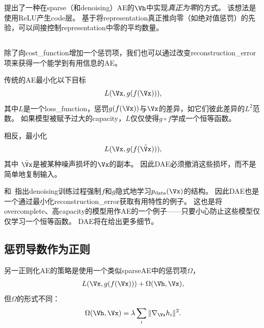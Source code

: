 \citet{Glorot+al-ICML-2011-small}提出了一种在\gls{sparse}（和\gls{denoising}）\gls{AE}的$\Vh$中实现\emph{真正为零}的方式。
该想法是使用\gls{ReLU}产生\gls{code}层。
基于将\gls{representation}真正推向零（如绝对值惩罚）的先验，可以间接控制\gls{representation}中零的平均数量。



\subsection{}
\label{sec:sub_denoising_autoencoders}
除了向\gls{cost_function}增加一个惩罚项，我们也可以通过改变\gls{reconstruction_error}项来获得一个能学到有用信息的\gls{AE}。


传统的\gls{AE}最小化以下目标
\begin{align}
    L(\Vx, g(f(\Vx))),
\end{align}
其中$L$是一个\gls{loss_function}，惩罚$g(f(\Vx))$与$\Vx$的差异，如它们彼此差异的$L^2$范数。
如果模型被赋予过大的\gls{capacity}，$L$仅仅使得$g \circ  f$学成一个恒等函数。


相反，最小化 
\begin{align}
    L(\Vx, g(f(\tilde \Vx))),
\end{align}
其中 $\tilde \Vx$是被某种噪声损坏的$\Vx$的副本。
因此\gls{DAE}必须撤消这些损坏，而不是简单地复制输入。

\citet{Alain+Bengio-ICLR2013-small}和~\citet{Bengio-et-al-NIPS2013-small}指出\gls{denoising}训练过程强制$f$和$g$隐式地学习$p_{\text{data}} (\Vx)$的结构。
因此\gls{DAE}也是一个通过最小化\gls{reconstruction_error}获取有用特性的例子。
这也是将\gls{overcomplete}、高\gls{capacity}的模型用作\gls{AE}的一个例子——只要小心防止这些模型仅仅学习一个恒等函数。
\gls{DAE}将在给出更多细节。


\subsection{惩罚导数作为正则}
\label{sec:regularizing_by_penalizing_derivatives}
另一正则化\gls{AE}的策略是使用一个类似\gls{sparse}\gls{AE}中的惩罚项$\Omega$，
\begin{align}
    L(\Vx, g(f(\Vx))) + \Omega(\Vh, \Vx),
\end{align}
但$\Omega$的形式不同：
\begin{align}
\Omega(\Vh, \Vx) = \lambda \sum_i \| \nabla_{\Vx}h_i \|^2.
\end{align}


